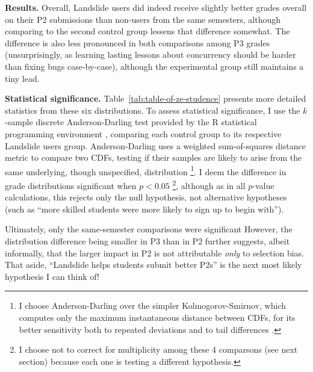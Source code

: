 {\bf Results.}
Overall,
Landslide users did indeed receive
slightly better grades overall on their P2 submissions than non-users from the same semesters,
although comparing to the second control group lessens that difference somewhat.
The difference is also less pronounced in both comparisons among P3 grades
(unsurprisingly, as learning lasting lessons about concurrency should be harder than fixing bugs case-by-case),
although the experimental group still maintains a tiny lead.

{\bf Statistical significance.}
Table~\ref{tab:table-of-ze-studence} presents more detailed statistics from these six distributions.
To assess statistical significance,
I use the $k$-sample discrete Anderson-Darling test \cite{anderson-darling}
provided by the R statistical programming environment \cite{r-lang,r-ksamples},
comparing each control group to its respective Landslide users group.
Anderson-Darling uses a weighted sum-of-squares distance metric to compare two CDFs,
testing if their samples are likely to arise from the same underlying, though unspecified, distribution%
\footnote{
I choose Anderson-Darling over the simpler Kolmogorov-Smirnov,
which computes only the maximum instantaneous distance between CDFs,
for its better sensitivity both to repeated deviations and to tail differences \cite{beware-kolmogorov-smirnov}.
}.
I deem the difference in grade distributions significant when $p < 0.05$%
\footnote{I choose not to correct for multiplicity among these 4 comparsons (see next section)
because each one is testing a different hypothesis.
},
although as in all $p$-value calculations,
this rejects only the null hypothesis,
not alternative hypotheses (such as ``more skilled students were more likely to sign up to begin with'').

Ultimately, only the same-semester comparisons were significant
However, the distribution difference being smaller in P3 than in P2
further suggests, albeit informally,
that the larger impact in P2 is not attributable {\em only} to selection bias.
That aside, ``Landslide helps students submit better P2s'' is the next most likely hypothesis I can think of!


